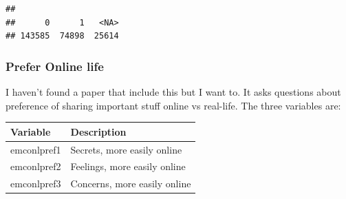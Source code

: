 \documentclass[
]{article}
\newenvironment{Shaded}{\begin{snugshade}}{\end{snugshade}}
\newcommand{\AttributeTok}[1]{\textcolor[rgb]{0.13,0.29,0.53}{#1}}
\newcommand{\CommentTok}[1]{\textcolor[rgb]{0.56,0.35,0.01}{\textit{#1}}}
\newcommand{\ConstantTok}[1]{\textcolor[rgb]{0.56,0.35,0.01}{#1}}
\newcommand{\DecValTok}[1]{\textcolor[rgb]{0.00,0.00,0.81}{#1}}
\newcommand{\FunctionTok}[1]{\textcolor[rgb]{0.13,0.29,0.53}{\textbf{#1}}}
\newcommand{\NormalTok}[1]{#1}
\newcommand{\OtherTok}[1]{\textcolor[rgb]{0.56,0.35,0.01}{#1}}
\newcommand{\SpecialCharTok}[1]{\textcolor[rgb]{0.81,0.36,0.00}{\textbf{#1}}}
\newcommand{\StringTok}[1]{\textcolor[rgb]{0.31,0.60,0.02}{#1}}
\begin{document}
\begin{Shaded}
\end{Shaded}

\begin{verbatim}
## 
##      0      1   <NA> 
## 143585  74898  25614
\end{verbatim}

\subsubsection{Prefer Online life}\label{prefer-online-life}

I haven't found a paper that include this but I want to. It asks
questions about preference of sharing important stuff online vs
real-life. The three variables are:

\begin{longtable}[]{@{}ll@{}}
\toprule\noalign{}
Variable & Description \\
\midrule\noalign{}
\endhead
\bottomrule\noalign{}
\endlastfoot
emconlpref1 & Secrets, more easily online \\
emconlpref2 & Feelings, more easily online \\
emconlpref3 & Concerns, more easily online \\
\end{longtable}
\end{document}
